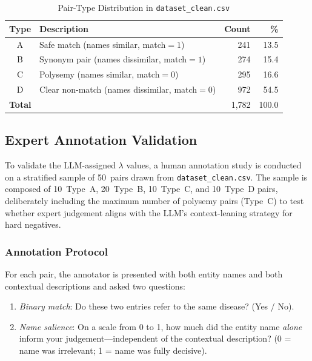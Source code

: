\begin{table}[h]
\caption{Pair-Type Distribution in \texttt{dataset\_clean.csv}}
\label{tab:pairtypes}
\centering
\begin{tabular}{clrr}
\toprule
\textbf{Type} & \textbf{Description} & \textbf{Count} & \textbf{\%} \\
\midrule
A & Safe match (names similar, match$=1$)          & 241 & 13.5 \\
B & Synonym pair (names dissimilar, match$=1$)     & 274 & 15.4 \\
C & Polysemy (names similar, match$=0$)            & 295 & 16.6 \\
D & Clear non-match (names dissimilar, match$=0$)  & 972 & 54.5 \\
\midrule
\multicolumn{2}{l}{\textbf{Total}} & 1{,}782 & 100.0 \\
\bottomrule
\end{tabular}
\end{table}

\subsection{Expert Annotation Validation}
\label{sec:expert_validation}

To validate the LLM-assigned $\lambda$ values, a human annotation
study is conducted on a stratified sample of 50~pairs drawn from
\texttt{dataset\_clean.csv}. The sample is composed of
10~Type~A, 20~Type~B, 10~Type~C, and 10~Type~D pairs, deliberately
including the maximum number of polysemy pairs (Type~C) to test whether
expert judgement aligns with the LLM's context-leaning strategy for
hard negatives.

\subsubsection{Annotation Protocol}

For each pair, the annotator is presented with both entity names and
both contextual descriptions and asked two questions:
\begin{enumerate}
  \item \emph{Binary match}: Do these two entries refer to the same
    disease? (Yes / No).
  \item \emph{Name salience}: On a scale from 0 to 1, how much did the
    entity name \emph{alone} inform your judgement---independent of the
    contextual description? (0 = name was irrelevant; 1 = name was
    fully decisive).
\end{enumerate}

